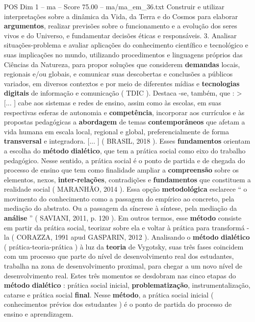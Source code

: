 \begin{textsample}{POS Dim 1 – ma – Score 75.00 – ma/ma\_em\_36.txt}
Construir e utilizar interpretações sobre a dinâmica da Vida, da Terra e do Cosmos para elaborar \textbf{argumentos}, realizar previsões sobre o funcionamento e a evolução dos seres vivos e do Universo, e fundamentar decisões éticas e responsáveis. 3.
Analisar situações-problema e avaliar aplicações do conhecimento científico e tecnológico e suas implicações no mundo, utilizando procedimentos e linguagens próprios das Ciências da Natureza, para propor soluções que considerem \textbf{demandas} locais, regionais e/ou globais, e comunicar suas descobertas e conclusões a públicos variados, em diversos contextos e por meio de diferentes mídias e \textbf{tecnologias} \textbf{digitais} de informação e comunicação ( TDIC ).
Destaca -se, também, que : > [... ] cabe aos sistemas e redes de ensino, assim como às escolas, em suas respectivas esferas de autonomia e \textbf{competência}, incorporar aos currículos e às propostas pedagógicas a \textbf{abordagem} de temas \textbf{contemporâneos} que afetam a vida humana em escala local, regional e global, preferencialmente de forma \textbf{transversal} e integradora. [... ] ( BRASIL, 2018 ).
Esses \textbf{fundamentos} orientam a escolha do \textbf{método} \textbf{dialético}, que tem a prática social como eixo do trabalho pedagógico.
Nesse sentido, a prática social é o ponto de partida e de chegada do processo de ensino que tem como finalidade ampliar a \textbf{compreensão} sobre os elementos, nexos, \textbf{inter-relações}, contradições e \textbf{fundamentos} que constituem a realidade social ( MARANHÃO, 2014 ).
Essa opção \textbf{metodológica} esclarece “ o movimento do conhecimento como a passagem do empírico ao concreto, pela mediação do abstrato.
Ou a passagem da síncrese à síntese, pela mediação da \textbf{análise} ” ( SAVIANI, 2011, p. 120 ).
Em outros termos, esse \textbf{método} consiste em partir da prática social, teorizar sobre ela e voltar à prática para transformá -la ( CORAZZA, 1991 apud GASPARIN, 2012 ).
Analisando o \textbf{método} \textbf{dialético} ( prática-teoria-prática ) à luz da \textbf{teoria} de Vygotsky, suas três fases coincidem com um processo que parte do nível de desenvolvimento real dos estudantes, trabalha na zona de desenvolvimento proximal, para chegar a um novo nível de desenvolvimento real.
Estes três momentos se desdobram nas cinco etapas do \textbf{método} \textbf{dialético} : prática social inicial, \textbf{problematização}, instrumentalização, catarse e prática social \textbf{final}.
Nesse \textbf{método}, a prática social inicial ( conhecimentos prévios dos estudantes ) é o ponto de partida do processo de ensino e aprendizagem.

\end{textsample}
